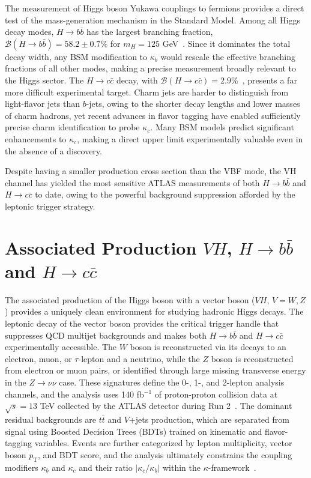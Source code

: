 The measurement of Higgs boson Yukawa couplings to fermions provides a direct test of the mass-generation mechanism in the Standard Model. 
Among all Higgs decay modes, $H \rightarrow b\bar{b}$ has the largest branching fraction, $\mathcal{B}(H \rightarrow b\bar{b}) = 58.2 \pm 0.7\%$ for $m_H = 125$ GeV~\cite{LHCHiggsXSWG4}. Since it dominates the total decay width, any BSM modification to $\kappa_b$ would rescale the effective branching fractions of all other modes, making a precise measurement broadly relevant to the Higgs sector.
The $H \rightarrow c\bar{c}$ decay, with $\mathcal{B}(H \rightarrow c\bar{c}) = 2.9\%$~\cite{LHCHiggsXSWG4}, presents a far more difficult experimental target. Charm jets are harder to distinguish from light-flavor jets than $b$-jets, owing to the shorter decay lengths and lower masses of charm hadrons, yet recent advances in flavor tagging have enabled sufficiently precise charm identification to probe $\kappa_c$. Many BSM models predict significant enhancements to $\kappa_c$, making a direct upper limit experimentally valuable even in the absence of a discovery.

Despite having a smaller production cross section than the VBF mode, the VH channel has yielded the most sensitive ATLAS measurements of both $H \rightarrow b\bar{b}$ and $H \rightarrow c\bar{c}$ to date, owing to the powerful background suppression afforded by the leptonic trigger strategy.

\section{\texorpdfstring{Associated Production $VH$, $H \rightarrow b\bar{b}$ and $H \rightarrow c\bar{c}$}{Associated Production VH, H→bb and H→cc}}
\label{sec:VH_analysis}

The associated production of the Higgs boson with a vector boson ($VH$, $V = W, Z$) provides a uniquely clean environment for studying hadronic Higgs decays. 
The leptonic decay of the vector boson provides the critical trigger handle that suppresses QCD multijet backgrounds and makes both $H \rightarrow b\bar{b}$ and $H \rightarrow c\bar{c}$ experimentally accessible. 
The $W$ boson is reconstructed via its decays to an electron, muon, or $\tau$-lepton and a neutrino, while the $Z$ boson is reconstructed from electron or muon pairs, or identified through large missing transverse energy in the $Z \rightarrow \nu\nu$ case. 
These signatures define the 0-, 1-, and 2-lepton analysis channels, and the analysis uses 140 fb$^{-1}$ of proton-proton collision data at $\sqrt{s} = 13$ TeV collected by the ATLAS detector during Run 2~\cite{VH}. 
The dominant residual backgrounds are $t\bar{t}$ and $V$+jets production, which are separated from signal using Boosted Decision Trees (BDTs) trained on kinematic and flavor-tagging variables. 
Events are further categorized by lepton multiplicity, vector boson $p_\mathrm{T}$, and BDT score, and the analysis ultimately constrains the coupling modifiers $\kappa_b$ and $\kappa_c$ and their ratio $|\kappa_c/\kappa_b|$ within the $\kappa$-framework~\cite{LHCHiggsXSWG4}.

